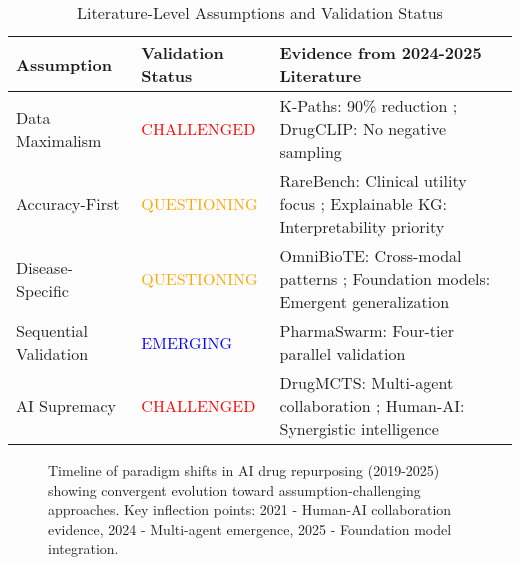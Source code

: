 \documentclass{article}
\begin{document}
\begin{table}[t]
\caption{Literature-Level Assumptions and Validation Status}
\label{tab:assumptions_validation}
\centering
\begin{tabular}{p{4cm}p{3cm}p{4.5cm}}
\toprule
\textbf{Assumption} & \textbf{Validation Status} & \textbf{Evidence from 2024-2025 Literature} \\
\midrule
Data Maximalism & \textcolor{red}{CHALLENGED} & K-Paths: 90\% reduction \cite{kpaths_2025}; DrugCLIP: No negative sampling \cite{drugclip_2024} \\
\midrule
Accuracy-First & \textcolor{orange}{QUESTIONING} & RareBench: Clinical utility focus \cite{rarebench_2024}; Explainable KG: Interpretability priority \cite{kg_explainable_rare_2024} \\
\midrule
Disease-Specific & \textcolor{orange}{QUESTIONING} & OmniBioTE: Cross-modal patterns \cite{omnibioTE_2024}; Foundation models: Emergent generalization \\
\midrule
Sequential Validation & \textcolor{blue}{EMERGING} & PharmaSwarm: Four-tier parallel validation \cite{pharmaswarm_2025} \\
\midrule
AI Supremacy & \textcolor{red}{CHALLENGED} & DrugMCTS: Multi-agent collaboration \cite{drugmcts_2025}; Human-AI: Synergistic intelligence \cite{challa_human_ai_2021} \\
\bottomrule
\end{tabular}
\end{table}

\begin{figure}[t]
\centering
{}
\caption{Timeline of paradigm shifts in AI drug repurposing (2019-2025) showing convergent evolution toward assumption-challenging approaches. Key inflection points: 2021 - Human-AI collaboration evidence, 2024 - Multi-agent emergence, 2025 - Foundation model integration.}
\label{fig:paradigm_timeline}
\end{figure}
\end{document}
